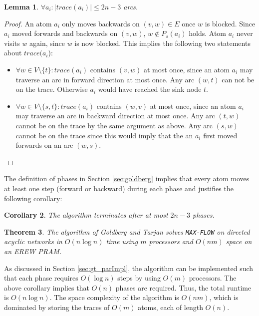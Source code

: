 \documentclass[a4paper,10pt, twocolumn]{article}
\newtheorem{lemma}{Lemma}
\newtheorem{corollary}[lemma]{Corollary}
\newtheorem{theorem}[lemma]{Theorem}
\begin{document}
\begin{lemma}
$\forall a_i:\lvert trace(a_i) \rvert \leq 2n-3$ arcs.
\end{lemma}
\begin{proof}
An atom $a_i$ only moves backwards on $(v,w) \in E$ once $w$ is blocked. Since $a_i$ moved forwards and backwards on $(v,w)$, $w \notin P_s(a_i)$ holds. Atom $a_i$ never visits $w$ again, since $w$ is now blocked. This implies the following two statements about $trace(a_i$):
\begin{itemize}
	\item $\forall w \in V \setminus \{t\}: trace(a_i)$ contains $(v,w)$ at most once, since an atom $a_i$ may traverse an arc in forward direction at most once. Any arc $(w,t)$ can not be on the trace. Otherwise $a_i$ would have reached the sink node $t$.
	\item $\forall w \in V \setminus \{s,t\}: trace(a_i)$ contains $(w,v)$ at most once, since an atom $a_i$ may traverse an arc in backward direction at most once. Any arc $(t,w)$ cannot be on the trace by the same argument as above.  Any arc $(s,w)$ cannot be on the trace since this would imply that the an $a_i$ first moved forwards on an arc $(w,s)$.
\end{itemize}
\end{proof}

The definition of phases in Section \ref{sec:goldberg} implies that every atom moves at least one step (forward or backward) during each phase and justifies the following corollary:
\begin{corollary}
The algorithm terminates after at most $2n-3$ phases.
\end{corollary}

\begin{theorem}
The algorithm of Goldberg and Tarjan solves \lstinline|MAX-FLOW| on directed acyclic networks in $O(n \log n)$ time using $m$ processors and $O(nm)$ space on an EREW PRAM\cite{goldberg89}.
\end{theorem}

As discussed in Section \ref{sec:gt_parImpl}, the algorithm can be implemented such that each phase requires $O(\log n)$ steps by using $O(m)$ processors. The above corollary implies that $O(n)$ phases are required. Thus, the total runtime is $O(n\log n)$. The space complexity of the algorithm is $O(nm)$, which is dominated by storing the traces of $O(m)$ atoms, each of length $O(n)$.  
\end{document}
